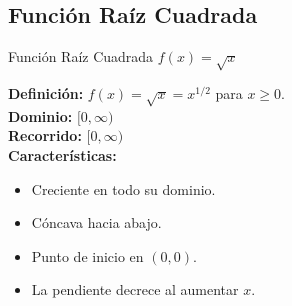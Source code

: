 \documentclass[12pt,a4paper]{article}
\begin{document}
\subsection{Función Raíz Cuadrada}
\begin{funcbox}{Función Raíz Cuadrada $f(x)=\sqrt{x}$}
\begin{minipage}[t]{0.55\textwidth}
    \textbf{Definición:} $f(x)=\sqrt{x}=x^{1/2}$ para $x\geq 0$.\\
    \textbf{Dominio:} $[0,\infty)$\\
    \textbf{Recorrido:} $[0,\infty)$\\
    \textbf{Características:}
    \begin{itemize}
        \item Creciente en todo su dominio.
        \item Cóncava hacia abajo.
        \item Punto de inicio en $(0,0)$.
        \item La pendiente decrece al aumentar $x$.
    \end{itemize}
\end{minipage}\hfill
\begin{minipage}[t]{0.4\textwidth}
    \centering
\end{minipage}
\end{funcbox}

\end{document}
